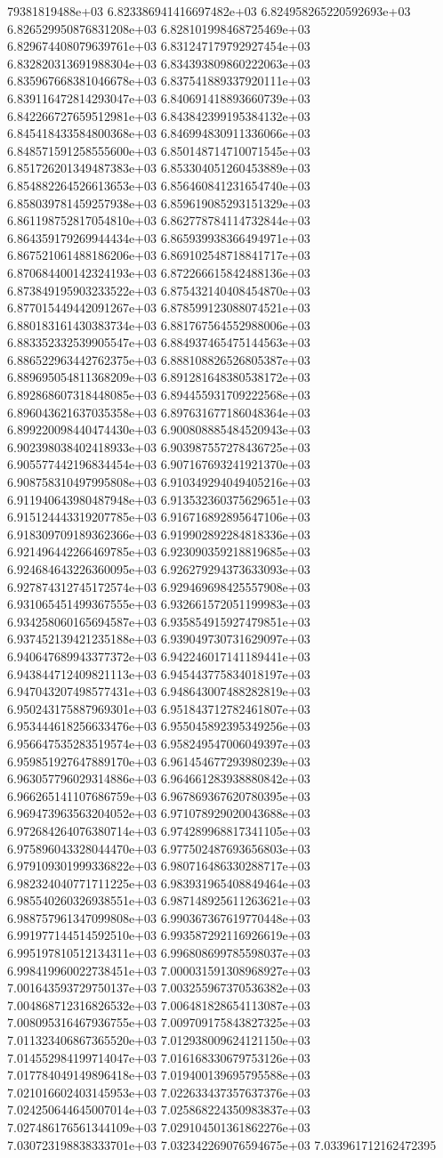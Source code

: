 79381819488e+03	6.823386941416697482e+03	6.824958265220592693e+03	6.826529950876831208e+03	6.828101998468725469e+03	6.829674408079639761e+03	6.831247179792927454e+03	6.832820313691988304e+03	6.834393809860222063e+03	6.835967668381046678e+03	6.837541889337920111e+03	6.839116472814293047e+03	6.840691418893660739e+03	6.842266727659512981e+03	6.843842399195384132e+03	6.845418433584800368e+03	6.846994830911336066e+03	6.848571591258555600e+03	6.850148714710071545e+03	6.851726201349487383e+03	6.853304051260453889e+03	6.854882264526613653e+03	6.856460841231654740e+03	6.858039781459257938e+03	6.859619085293151329e+03	6.861198752817054810e+03	6.862778784114732844e+03	6.864359179269944434e+03	6.865939938366494971e+03	6.867521061488186206e+03	6.869102548718841717e+03	6.870684400142324193e+03	6.872266615842488136e+03	6.873849195903233522e+03	6.875432140408454870e+03	6.877015449442091267e+03	6.878599123088074521e+03	6.880183161430383734e+03	6.881767564552988006e+03	6.883352332539905547e+03	6.884937465475144563e+03	6.886522963442762375e+03	6.888108826526805387e+03	6.889695054811368209e+03	6.891281648380538172e+03	6.892868607318448085e+03	6.894455931709222568e+03	6.896043621637035358e+03	6.897631677186048364e+03	6.899220098440474430e+03	6.900808885484520943e+03	6.902398038402418933e+03	6.903987557278436725e+03	6.905577442196834454e+03	6.907167693241921370e+03	6.908758310497995808e+03	6.910349294049405216e+03	6.911940643980487948e+03	6.913532360375629651e+03	6.915124443319207785e+03	6.916716892895647106e+03	6.918309709189362366e+03	6.919902892284818336e+03	6.921496442266469785e+03	6.923090359218819685e+03	6.924684643226360095e+03	6.926279294373633093e+03	6.927874312745172574e+03	6.929469698425557908e+03	6.931065451499367555e+03	6.932661572051199983e+03	6.934258060165694587e+03	6.935854915927479851e+03	6.937452139421235188e+03	6.939049730731629097e+03	6.940647689943377372e+03	6.942246017141189441e+03	6.943844712409821113e+03	6.945443775834018197e+03	6.947043207498577431e+03	6.948643007488282819e+03	6.950243175887969301e+03	6.951843712782461807e+03	6.953444618256633476e+03	6.955045892395349256e+03	6.956647535283519574e+03	6.958249547006049397e+03	6.959851927647889170e+03	6.961454677293980239e+03	6.963057796029314886e+03	6.964661283938880842e+03	6.966265141107686759e+03	6.967869367620780395e+03	6.969473963563204052e+03	6.971078929020043688e+03	6.972684264076380714e+03	6.974289968817341105e+03	6.975896043328044470e+03	6.977502487693656803e+03	6.979109301999336822e+03	6.980716486330288717e+03	6.982324040771711225e+03	6.983931965408849464e+03	6.985540260326938551e+03	6.987148925611263621e+03	6.988757961347099808e+03	6.990367367619770448e+03	6.991977144514592510e+03	6.993587292116926619e+03	6.995197810512134311e+03	6.996808699785598037e+03	6.998419960022738451e+03	7.000031591308968927e+03	7.001643593729750137e+03	7.003255967370536382e+03	7.004868712316826532e+03	7.006481828654113087e+03	7.008095316467936755e+03	7.009709175843827325e+03	7.011323406867365520e+03	7.012938009624121150e+03	7.014552984199714047e+03	7.016168330679753126e+03	7.017784049149896418e+03	7.019400139695795588e+03	7.021016602403145953e+03	7.022633437357637376e+03	7.024250644645007014e+03	7.025868224350983837e+03	7.027486176561344109e+03	7.029104501361862276e+03	7.030723198838333701e+03	7.032342269076594675e+03	7.033961712162472395